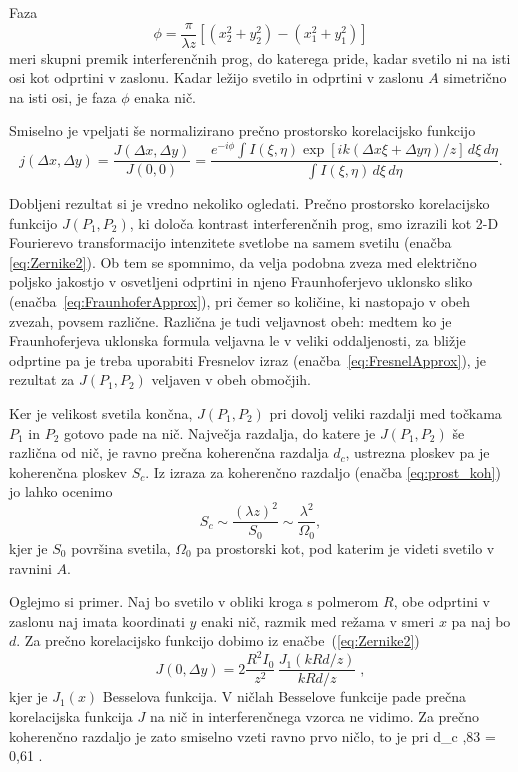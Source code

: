 Faza 
\begin{equation}
\phi=\frac{\pi}{\lambda z}[(x_{2}^{2}+y_{2}^{2})-(x_{1}^{2}+y_{1}^{2})]
\end{equation}
meri skupni premik interferenčnih prog, do katerega pride, kadar svetilo
ni na isti osi kot odprtini v zaslonu. Kadar ležijo svetilo in odprtini
v zaslonu $A$ simetrično na isti osi, je faza $\phi$ enaka nič.

Smiselno je vpeljati še normalizirano prečno prostorsko korelacijsko
funkcijo 
\begin{equation}
j(\Delta x,\Delta y)=\frac{J(\Delta x,\Delta y)}{J(0,0)}=\frac{e^{-i\phi}\int 
I(\xi,\eta)\exp\left[ik(\Delta x\xi+\Delta y\eta)/z\right]\, d\xi\, d\eta}
{\int I(\xi,\eta)\, d\xi\, d\eta}.
\label{eq:Zernike2-norm}
\end{equation}

Dobljeni rezultat si je vredno nekoliko ogledati. Prečno prostorsko
korelacijsko funkcijo $J(P_{1},P_{2})$, ki določa kontrast interferenčnih
prog, smo izrazili kot 2-D  Fourierevo transformacijo intenzitete svetlobe
na samem svetilu (enačba \ref{eq:Zernike2}). Ob tem se spomnimo,
da velja podobna zveza med električno poljsko jakostjo v osvetljeni odprtini 
in njeno Fraunhoferjevo uklonsko sliko (enačba~\ref{eq:FraunhoferApprox}), 
pri čemer so količine, ki nastopajo v obeh zvezah,
povsem različne. Različna je tudi veljavnost obeh: medtem ko je Fraunhoferjeva
uklonska formula veljavna le v veliki oddaljenosti, za bližje odprtine
pa je treba uporabiti Fresnelov izraz (enačba~\ref{eq:FresnelApprox}), 
je rezultat za $J(P_{1},P_{2})$ veljaven v obeh območjih.

Ker je velikost svetila končna, $J(P_{1},P_{2})$ pri dovolj veliki
razdalji med točkama $P_{1}$ in $P_{2}$ gotovo pade na nič. Največja
razdalja, do katere je $J(P_{1},P_{2})$ še različna od nič, je ravno
prečna koherenčna razdalja $d_{c}$, ustrezna ploskev pa je koherenčna
ploskev $S_{c}$. Iz izraza za koherenčno razdaljo 
(enačba \ref{eq:prost_koh}) jo lahko ocenimo
\begin{equation}
S_{c}\sim\frac{(\lambda z)^{2}}{S_{0}}\sim\frac{\lambda^{2}}{\Omega_{0}},
\label{eq:koherencna-ploskev}
\end{equation}
kjer je $S_{0}$ površina svetila, $\Omega_{0}$ pa prostorski kot,
pod katerim je videti svetilo v ravnini $A$. 

Oglejmo si primer. Naj bo svetilo v obliki kroga 
s polmerom $R$, obe odprtini v zaslonu naj imata koordinati $y$  enaki nič, razmik
med režama v smeri $x$ pa naj bo $d$. 
Za prečno korelacijsko funkcijo dobimo iz enačbe~(\ref{eq:Zernike2})
\begin{equation}
J(0,\Delta y)=2\frac{R^{2}I_{0}}{z^{2}}\,\frac{J_{1}(kRd/z)}{kRd/z}\;,
\end{equation}kjer je $J_{1}(x)$ Besselova funkcija. V ničlah Besselove funkcije
pade prečna korelacijska funkcija $J$ na nič in interferenčnega vzorca ne vidimo. 
Za prečno koherenčno razdaljo je zato smiselno vzeti ravno prvo ničlo, to
je pri
\beq
\label{eq:okroglo_svetilo}
d_{c} ,83  = 0,61 .
\eeq

